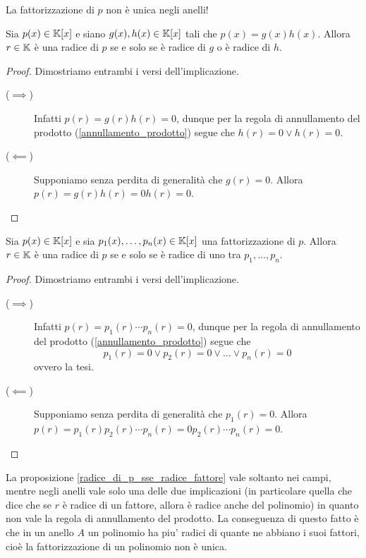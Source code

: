 \begin{remark}
    La fattorizzazione di $p$ non è unica negli anelli!
\end{remark}

\begin{proposition}\label{radice_di_p_sse_radice_fattore}
    Sia $p(x) \in \mathbb{K}[x]$ e siano $g(x), h(x) \in \mathbb{K}[x]$ tali che $p(x) = g(x)h(x)$. Allora $r \in \mathbb{K}$ è una radice di $p$ se e solo se è radice di $g$ o è radice di $h$.
\end{proposition}
\begin{proof}
    Dimostriamo entrambi i versi dell'implicazione.
    \begin{description}
        \item[($\implies$)] Infatti $p(r) = g(r)h(r) = 0$, dunque per la regola di annullamento del prodotto (\ref{annullamento_prodotto}) segue che $h(r) = 0 \lor h(r) = 0$.
        \item[($\impliedby$)] Supponiamo senza perdita di generalità che $g(r) = 0$. Allora $p(r) = g(r)h(r) = 0h(r) = 0$. \qedhere 
    \end{description}
\end{proof}
\begin{corollary}
    Sia $p(x) \in \mathbb{K}[x]$ e sia $p_1(x), \dots, p_n(x) \in \mathbb{K}[x]$ una fattorizzazione di $p$. Allora $r \in \mathbb{K}$ è una radice di $p$ se e solo se è radice di uno tra $p_1, \dots, p_n$.
\end{corollary}
\begin{proof}
    Dimostriamo entrambi i versi dell'implicazione.
    \begin{description}
        \item[($\implies$)] Infatti $p(r) = p_1(r) \cdots p_n(r) = 0$, dunque per la regola di annullamento del prodotto (\ref{annullamento_prodotto}) segue che \[
            p_1(r) = 0 \lor p_2(r) = 0 \lor \dots \lor p_n(r) = 0    
        \] ovvero la tesi.
        \item[($\impliedby$)] Supponiamo senza perdita di generalità che $p_1(r) = 0$. Allora $p(r) = p_1(r)p_2(r)\cdots p_n(r) = 0p_2(r)\cdots p_n(r) = 0$. \qedhere
    \end{description} 
\end{proof}

\begin{remark}
    La proposizione \ref{radice_di_p_sse_radice_fattore} vale soltanto nei campi, mentre negli anelli vale solo una delle due implicazioni (in particolare quella che dice che se $r$ è radice di un fattore, allora è radice anche del polinomio) in quanto non vale la regola di annullamento del prodotto. La conseguenza di questo fatto è che in un anello $A$ un polinomio ha piu' radici di quante ne abbiano i suoi fattori, cioè la fattorizzazione di un polinomio non è unica.
\end{remark}

